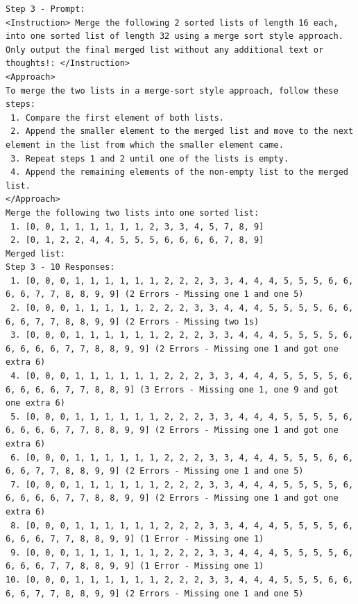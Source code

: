 \documentclass[11pt,UTF8,fontset=fandol]{ctexart}
\begin{document}
\begin{table}[H]\centering
\caption{对 32 元素列表的排序：第 3 步（提示/回复）。}
\label{tab:8}
\end{table}
\begin{lstlisting}
Step 3 - Prompt:
<Instruction> Merge the following 2 sorted lists of length 16 each, into one sorted list of length 32 using a merge sort style approach. Only output the final merged list without any additional text or thoughts!: </Instruction>
<Approach>
To merge the two lists in a merge-sort style approach, follow these steps:
 1. Compare the first element of both lists.
 2. Append the smaller element to the merged list and move to the next element in the list from which the smaller element came.
 3. Repeat steps 1 and 2 until one of the lists is empty.
 4. Append the remaining elements of the non-empty list to the merged list.
</Approach>
Merge the following two lists into one sorted list:
 1. [0, 0, 1, 1, 1, 1, 1, 1, 2, 3, 3, 4, 5, 7, 8, 9]
 2. [0, 1, 2, 2, 4, 4, 5, 5, 5, 6, 6, 6, 6, 7, 8, 9]
Merged list:
Step 3 - 10 Responses:
 1. [0, 0, 0, 1, 1, 1, 1, 1, 1, 2, 2, 2, 3, 3, 4, 4, 4, 5, 5, 5, 6, 6, 6, 6, 7, 7, 8, 8, 9, 9] (2 Errors - Missing one 1 and one 5)
 2. [0, 0, 0, 1, 1, 1, 1, 1, 2, 2, 2, 3, 3, 4, 4, 4, 5, 5, 5, 5, 6, 6, 6, 6, 7, 7, 8, 8, 9, 9] (2 Errors - Missing two 1s)
 3. [0, 0, 0, 1, 1, 1, 1, 1, 1, 2, 2, 2, 3, 3, 4, 4, 4, 5, 5, 5, 5, 6, 6, 6, 6, 6, 7, 7, 8, 8, 9, 9] (2 Errors - Missing one 1 and got one extra 6)
 4. [0, 0, 0, 1, 1, 1, 1, 1, 1, 2, 2, 2, 3, 3, 4, 4, 4, 5, 5, 5, 5, 6, 6, 6, 6, 6, 7, 7, 8, 8, 9] (3 Errors - Missing one 1, one 9 and got one extra 6)
 5. [0, 0, 0, 1, 1, 1, 1, 1, 1, 2, 2, 2, 3, 3, 4, 4, 4, 5, 5, 5, 5, 6, 6, 6, 6, 6, 7, 7, 8, 8, 9, 9] (2 Errors - Missing one 1 and got one extra 6)
 6. [0, 0, 0, 1, 1, 1, 1, 1, 1, 2, 2, 2, 3, 3, 4, 4, 4, 5, 5, 5, 6, 6, 6, 6, 7, 7, 8, 8, 9, 9] (2 Errors - Missing one 1 and one 5)
 7. [0, 0, 0, 1, 1, 1, 1, 1, 1, 2, 2, 2, 3, 3, 4, 4, 4, 5, 5, 5, 5, 6, 6, 6, 6, 6, 7, 7, 8, 8, 9, 9] (2 Errors - Missing one 1 and got one extra 6)
 8. [0, 0, 0, 1, 1, 1, 1, 1, 1, 2, 2, 2, 3, 3, 4, 4, 4, 5, 5, 5, 5, 6, 6, 6, 6, 7, 7, 8, 8, 9, 9] (1 Error - Missing one 1)
 9. [0, 0, 0, 1, 1, 1, 1, 1, 1, 2, 2, 2, 3, 3, 4, 4, 4, 5, 5, 5, 5, 6, 6, 6, 6, 7, 7, 8, 8, 9, 9] (1 Error - Missing one 1)
10. [0, 0, 0, 1, 1, 1, 1, 1, 1, 2, 2, 2, 3, 3, 4, 4, 4, 5, 5, 5, 6, 6, 6, 6, 7, 7, 8, 8, 9, 9] (2 Errors - Missing one 1 and one 5)
\end{lstlisting}
\end{document}
